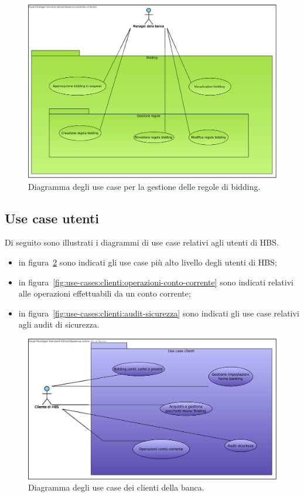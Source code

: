 \begin{figure}
	\centering
	\includegraphics[width=\textwidth]{Images/use-cases/Definizione_parametri_e_approvazione_bidding.eps}
	\caption{Diagramma degli use case per la gestione delle regole di bidding.}
	\label{fig:use-cases:amministrazione:gestione-bidding}
\end{figure}

\subsection{Use case utenti}

Di seguito sono illustrati i diagrammi di use case relativi agli utenti di HBS.

\begin{itemize}
	\item in figura~\ref{fig:use-cases:clienti} sono indicati gli use case più alto livello degli utenti di HBS;

	\item in figura~\ref{fig:use-cases:clienti:operazioni-conto-corrente} sono indicati relativi alle operazioni effettuabili da un conto corrente;

	\item in figura~\ref{fig:use-cases:clienti:audit-sicurezza} sono indicati gli use case relativi agli audit di sicurezza.
\end{itemize}

\begin{figure}
	\centering
	\includegraphics[width=\textwidth]{Images/use-cases/Clienti.eps}
	\caption{Diagramma degli use case dei clienti della banca.}
	\label{fig:use-cases:clienti}
\end{figure}


